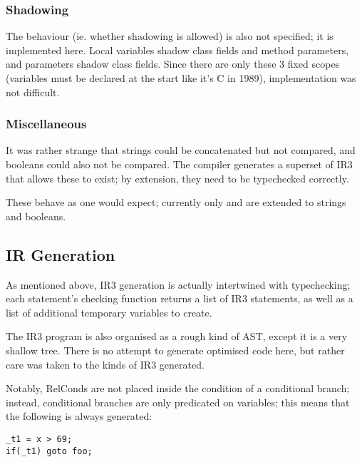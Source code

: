 \documentclass[12pt]{article}
\begin{document}


\subsubsection{Shadowing}

The behaviour (ie. whether shadowing is allowed) is also not specified; it is implemented here. Local variables shadow
class fields and method parameters, and parameters shadow class fields. Since there are only these 3 fixed scopes (variables
must be declared at the start like it's C in 1989), implementation was not difficult.



\subsubsection{Miscellaneous}

It was rather strange that strings could be concatenated but not compared, and booleans could also not be compared. The
compiler generates a superset of IR3 that allows these to exist; by extension, they need to be typechecked correctly.

These behave as one would expect; currently only \eqtt{==} and \eqtt{!=} are extended to strings and booleans.



\subsection{IR Generation}

As mentioned above, IR3 generation is actually intertwined with typechecking; each statement's checking function returns
a list of IR3 statements, as well as a list of additional temporary variables to create.

The IR3 program is also organised as a rough kind of AST, except it is a very shallow tree. There is no attempt to generate
optimised code here, but rather care was taken to  the kinds of IR3 generated.

Notably, RelConds are not placed inside the condition of a conditional branch; instead, conditional branches are only
predicated on variables; this means that the following is always generated:

\begin{verbatim}
_t1 = x > 69;
if(_t1) goto foo;
\end{verbatim}
\end{document}
